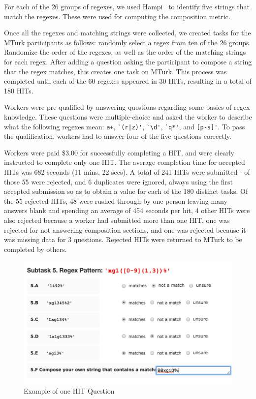 For each of the 26 groups of regexes, we used Hampi~\cite{hampi} to identify five strings that match the regexes. These were used for computing the composition metric.

Once all the regexes and matching strings were collected, we created tasks for the MTurk participants as follows: randomly select a regex from ten of the 26 groups. Randomize the order of the regexes, as well as the order of the matching strings for each regex. After adding a question asking the participant to compose a string that the regex matches, this creates one task on MTurk. This process was completed until each of the 60 regexes appeared in 30 HITs, resulting in a total of 180 HITs.

Workers were pre-qualified by answering questions regarding some basics of regex knowledge. These questions were multiple-choice and asked the worker to describe what the following regexes mean: \verb!a+!, \verb!`(r|z)'!, \verb!`\d'!, \verb!`q*'!, and \verb![p-s]'!. To pass the qualification, workers had to answer four of the five questions correctly.

Workers were paid \$3.00 for successfully completing a HIT, and were clearly instructed to complete only one HIT.  The average completion time for accepted HITs was 682 seconds (11 mins, 22 secs).  A total of 241 HITs were submitted - of those 55 were rejected, and 6 duplicates were ignored, always using the first accepted submission so as to obtain a value for each of the 180 distinct tasks.
Of the 55 rejected HITs, 48 were rushed through by one person leaving many answers blank and spending an average of 454 seconds per hit, 4 other HITs were also rejected because a worker had submitted more than one HIT, one was rejected for not answering composition sections, and one was rejected because it was missing data for 3 questions.  Rejected HITs were returned to MTurk to be completed by others.

\begin{figure}[tb]
\centering
\includegraphics[width=\columnwidth]{illustrations/exampleQuestion}
\vspace{-12pt}
\caption{Example of one HIT Question}
\vspace{-6pt}
\label{fig:exampleQuestion}
\end{figure}

